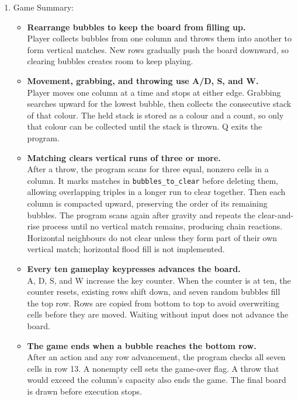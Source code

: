 \documentclass{article}
\begin{document}
\begin{enumerate}
\item Game Summary:
\begin{itemize}
\item \textbf{Rearrange bubbles to keep the board from filling up.}\\
Player collects bubbles from one column and throws them into another to form vertical matches. New rows gradually push the board downward, so clearing bubbles creates room to keep playing.

\item \textbf{Movement, grabbing, and throwing use A/D, S, and W.}\\
Player moves one column at a time and stops at either edge. Grabbing searches upward for the lowest bubble, then collects the consecutive stack of that colour. The held stack is stored as a colour and a count, so only that colour can be collected until the stack is thrown. Q exits the program.

\item \textbf{Matching clears vertical runs of three or more.}\\
After a throw, the program scans for three equal, nonzero cells in a column. It marks matches in \texttt{bubbles\_to\_clear} before deleting them, allowing overlapping triples in a longer run to clear together. Then each column is compacted upward, preserving the order of its remaining bubbles. The program scans again after gravity and repeats the clear-and-rise process until no vertical match remains, producing chain reactions. Horizontal neighbours do not clear unless they form part of their own vertical match; horizontal flood fill is not implemented.

\item \textbf{Every ten gameplay keypresses advances the board.}\\
A, D, S, and W increase the key counter. When the counter is at ten, the counter resets, existing rows shift down, and seven random bubbles fill the top row. Rows are copied from bottom to top to avoid overwriting cells before they are moved. Waiting without input does not advance the board.

\item \textbf{The game ends when a bubble reaches the bottom row.}\\
After an action and any row advancement, the program checks all seven cells in row 13. A nonempty cell sets the game-over flag. A throw that would exceed the column's capacity also ends the game. The final board is drawn before execution stops. 


\end{itemize}
\end{enumerate}
\end{document}
